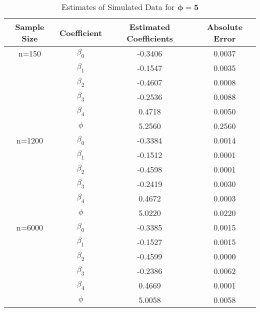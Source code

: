 \documentclass{svproc}
\begin{document}
\begin{table}[H]
\caption{Estimates of Simulated Data for $\bm{\phi=5}$}
\fontsize{9}{10}\selectfont
\begin{center}
\begin{tabular}{|c|c|c|c|}
\hline
\textbf{Sample Size} & \textbf{Coefficient} & \textbf{Estimated Coefficients} & \textbf{Absolute Error} \\
\hline
n=150 & $\beta_0$ & -0.3406 & 0.0037 \\
 & $\beta_1$ & -0.1547 & 0.0035 \\
 & $\beta_2$ & -0.4607 & 0.0008 \\
 & $\beta_3$ & -0.2536 & 0.0088 \\
 & $\beta_4$ & 0.4718 & 0.0050 \\
 & $\phi$ & 5.2560 &  0.2560 \\
\hline
n=1200 & $\beta_0$ & -0.3384 & 0.0014 \\
 & $\beta_1$ & -0.1512 & 0.0001 \\
 & $\beta_2$ & -0.4598 & 0.0001 \\
 & $\beta_3$ & -0.2419 & 0.0030 \\
 & $\beta_4$ & 0.4672 & 0.0003 \\
 & $\phi$ & 5.0220 & 0.0220 \\
\hline
n=6000 & $\beta_0$ & -0.3385 & 0.0015 \\
 & $\beta_1$ & -0.1527 & 0.0015 \\
 & $\beta_2$ & -0.4599 & 0.0000 \\
 & $\beta_3$ & -0.2386 & 0.0062 \\
 & $\beta_4$ & 0.4669 & 0.0001 \\
 & $\phi$ & 5.0058 & 0.0058 \\
\hline
\end{tabular}
\medskip
\label{tab:est5}
\end{center}
\end{table}
\end{document}
